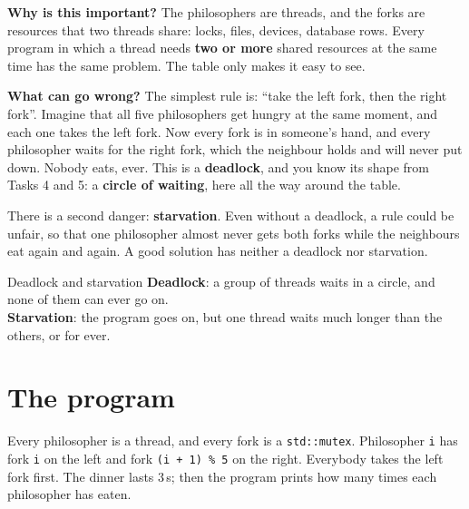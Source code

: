 \textbf{Why is this important?} The philosophers are threads, and the forks are resources that two threads share:
locks, files, devices, database rows. Every program in which a thread needs \textbf{two or more} shared resources at
the same time has the same problem. The table only makes it easy to see.

\textbf{What can go wrong?} The simplest rule is: ``take the left fork, then the right fork''. Imagine that all five
philosophers get hungry at the same moment, and each one takes the left fork. Now every fork is in someone's hand,
and every philosopher waits for the right fork, which the neighbour holds and will never put down. Nobody eats, ever.
This is a \textbf{deadlock}, and you know its shape from Tasks 4 and 5: a \textbf{circle of waiting}, here all the way
around the table.

There is a second danger: \textbf{starvation}. Even without a deadlock, a rule could be unfair, so that one
philosopher almost never gets both forks while the neighbours eat again and again. A good solution has neither
a deadlock nor starvation.

\begin{definition}{Deadlock and starvation}
\textbf{Deadlock}: a group of threads waits in a circle, and none of them can ever go on.\\
\textbf{Starvation}: the program goes on, but one thread waits much longer than the others, or for ever.
\end{definition}

\section{The program}

Every philosopher is a thread, and every fork is a \texttt{std::mutex}. Philosopher \texttt{i} has fork \texttt{i}
on the left and fork \texttt{(i + 1) \% 5} on the right. Everybody takes the left fork first. The dinner lasts 3\,s;
then the program prints how many times each philosopher has eaten.

